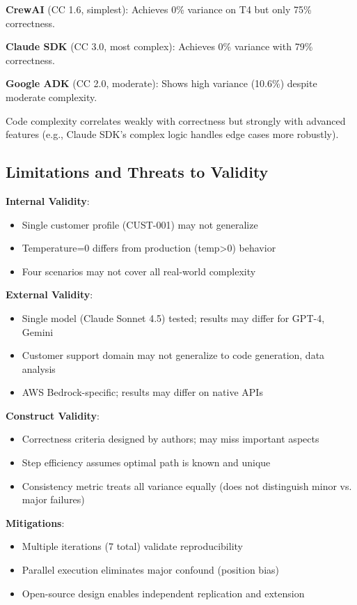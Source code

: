 \documentclass[sigconf,nonacm]{acmart}
\begin{document}
\textbf{CrewAI} (CC 1.6, simplest): Achieves 0\% variance on T4 but only 75\% correctness.

\textbf{Claude SDK} (CC 3.0, most complex): Achieves 0\% variance with 79\% correctness.

\textbf{Google ADK} (CC 2.0, moderate): Shows high variance (10.6\%) despite moderate complexity.

Code complexity correlates weakly with correctness but strongly with advanced features (e.g., Claude SDK's complex logic handles edge cases more robustly).

\subsection{Limitations and Threats to Validity}

\textbf{Internal Validity}:
\begin{itemize}
\item Single customer profile (CUST-001) may not generalize
\item Temperature=0 differs from production (temp>0) behavior
\item Four scenarios may not cover all real-world complexity
\end{itemize}

\textbf{External Validity}:
\begin{itemize}
\item Single model (Claude Sonnet 4.5) tested; results may differ for GPT-4, Gemini
\item Customer support domain may not generalize to code generation, data analysis
\item AWS Bedrock-specific; results may differ on native APIs
\end{itemize}

\textbf{Construct Validity}:
\begin{itemize}
\item Correctness criteria designed by authors; may miss important aspects
\item Step efficiency assumes optimal path is known and unique
\item Consistency metric treats all variance equally (does not distinguish minor vs. major failures)
\end{itemize}

\textbf{Mitigations}:
\begin{itemize}
\item Multiple iterations (7 total) validate reproducibility
\item Parallel execution eliminates major confound (position bias)
\item Open-source design enables independent replication and extension
\end{itemize}
\end{document}
